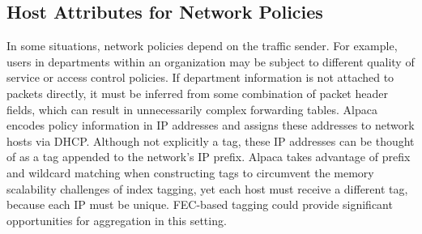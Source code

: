 \subsection{Host Attributes for Network Policies}
In some situations, network policies depend on the traffic sender.  For
example, users in departments within an organization may be subject
to different quality of service or access control policies. If
department information is not attached to packets directly, it must be
inferred from some combination of packet header fields, which can result
in unnecessarily complex forwarding tables.  Alpaca~\cite{alpaca}
encodes policy information in IP addresses and assigns these addresses
to network hosts via DHCP. Although not explicitly a tag, these IP
addresses can be thought of as a tag appended to the network's IP
prefix. Alpaca takes advantage of prefix and wildcard matching when
constructing tags to circumvent the memory scalability challenges of
index tagging, yet each host must receive a different tag, because each
IP must be unique. FEC-based tagging could provide significant
opportunities for aggregation in this setting.


